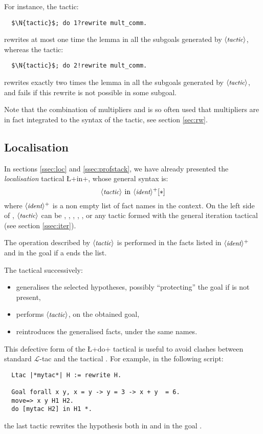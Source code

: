 For instance, the tactic:
\begin{lstlisting}
  $\N{tactic}$; do 1?rewrite mult_comm.
\end{lstlisting}
rewrites at most one time the lemma  in all the subgoals
generated by $\langle\mbox{\itshape\rmfamily\small tactic}\rangle$, whereas the tactic:
\begin{lstlisting}
  $\N{tactic}$; do 2!rewrite mult_comm.
\end{lstlisting}
rewrites exactly two times the lemma  in all the subgoals
generated by $\langle\mbox{\itshape\rmfamily\small tactic}\rangle$, and fails if this rewrite is not possible
in some subgoal.

Note that the combination of multipliers and  is so often
used that multipliers are in fact integrated to the syntax of the \ssr{}
 tactic, see section \ref{sec:rw}.

\subsection{Localisation}\label{ssec:gloc}

In sections \ref{ssec:loc} and \ref{ssec:profstack}, we have already
presented the \emph{localisation} tactical \L+in+, whose general
syntax is:
$$\N{tactic}\ \C{in}\ \N{ident}^+ [\C{*}]$$
where $\langle\mbox{\itshape\rmfamily\small ident}\rangle^+$ is a non empty list of fact
names in the context. On the left side of , $\langle\mbox{\itshape\rmfamily\small tactic}\rangle$ can be 
, , , , ,
 or any tactic formed with the general iteration tactical  (see
 section \ref{ssec:iter}).

The operation described by $\langle\mbox{\itshape\rmfamily\small tactic}\rangle$ is performed in the facts
listed in $\langle\mbox{\itshape\rmfamily\small ident}\rangle^+$ and in the goal if a \C{*} ends
the list.

The  tactical successively:
\begin{itemize}
\item generalises the selected hypotheses, possibly ``protecting'' the
 goal if \C{*} is not present,
\item performs $\langle\mbox{\itshape\rmfamily\small tactic}\rangle$, on the obtained goal,
\item reintroduces the generalised facts, under the same names.
\end{itemize}

This defective form of the \L+do+ tactical is useful to avoid clashes
between standard $\mathcal{L}$-tac  and the \ssr{} tactical .
For example, in the following script:
\begin{lstlisting}
  Ltac |*mytac*| H := rewrite H.

  Goal forall x y, x = y -> y = 3 -> x + y  = 6.
  move=> x y H1 H2.
  do [mytac H2] in H1 *.
\end{lstlisting}
the last tactic rewrites the hypothesis  both in
 and in the goal .

